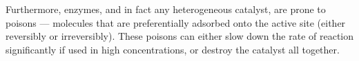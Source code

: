 				Furthermore, enzymes, and in fact any heterogeneous catalyst, are prone to poisons --- molecules that are preferentially
				adsorbed onto the active site (either reversibly or irreversibly). These poisons can either slow down the rate of reaction
				significantly if used in high concentrations, or destroy the catalyst all together.














